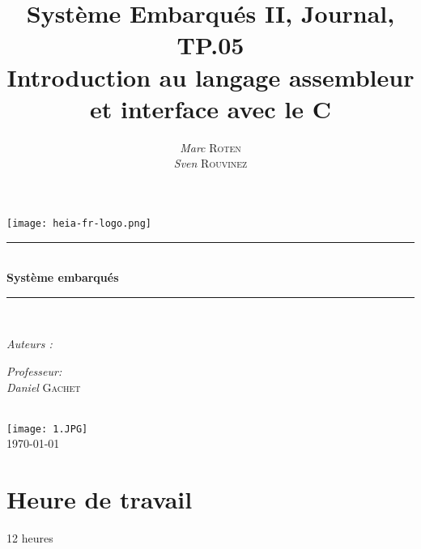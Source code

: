 

\title{Système Embarqués II, Journal, TP.05\\  Introduction au langage assembleur et interface avec le C}
\author{\textsl{Marc} \textsc{Roten} \\ \textsl{Sven} \textsc{Rouvinez}}
\date{}


    \begin{titlepage}
        \begin{center}
            \texttt{[image: heia-fr-logo.png]}\\[1.3cm]
            
            \rule{\linewidth}{0.3mm} \\[0.3cm]
            {\huge \bfseries Système embarqués \\[0.5cm]} 
            \rule{\linewidth}{0.3mm} \\[0.8cm]
            \noindent
            \begin{minipage}[t]{0.4\textwidth}
                \begin{flushleft} \large
                    \emph{Auteurs :}\\
                    \theauthor
                \end{flushleft}
            \end{minipage}
            \begin{minipage}[t]{0.4\textwidth} 
                \begin{flushright} \large
                    \emph{Professeur:}\\
                    \textsl{Daniel} \textsc{Gachet}\\ 
                \end{flushright} 
                \vfill
            \end{minipage}\\[1.3cm]
            \texttt{[image: 1.JPG]}\\[1.5cm]
            \vspace*{1\baselineskip}
            \today \\[0.7cm]
        \end{center}
    \end{titlepage}
    \tableofcontents
    \clearpage
\section{Heure de travail}
12 heures

